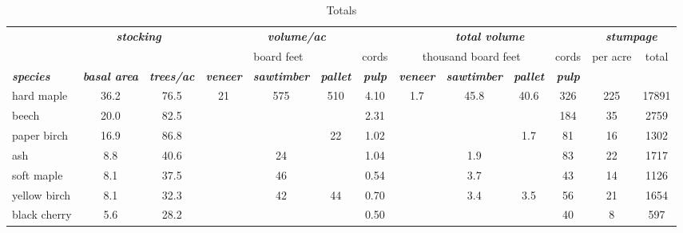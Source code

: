\documentclass[landscape]{article}
\begin{document}
\begin{table}[H]

\caption{\label{tab:unnamed-chunk-58}Totals}
\fontsize{10}{12}\selectfont
\begin{tabular}[t]{lcccccccccccc}
\toprule
\multicolumn{1}{c}{\em{\textbf{ }}} & \multicolumn{2}{c}{\em{\textbf{stocking}}} & \multicolumn{4}{c}{\em{\textbf{volume/ac }}} & \multicolumn{4}{c}{\em{\textbf{total volume}}} & \multicolumn{2}{c}{\em{\textbf{stumpage}}} \\
\cmidrule(l{3pt}r{3pt}){2-3} \cmidrule(l{3pt}r{3pt}){4-7} \cmidrule(l{3pt}r{3pt}){8-11} \cmidrule(l{3pt}r{3pt}){12-13}
\multicolumn{3}{c}{ } & \multicolumn{3}{c}{board feet} & \multicolumn{1}{c}{cords} & \multicolumn{3}{c}{thousand board feet} & \multicolumn{1}{c}{cords} & \multicolumn{1}{c}{per acre} & \multicolumn{1}{c}{total} \\
\cmidrule(l{3pt}r{3pt}){4-6} \cmidrule(l{3pt}r{3pt}){7-7} \cmidrule(l{3pt}r{3pt}){8-10} \cmidrule(l{3pt}r{3pt}){11-11} \cmidrule(l{3pt}r{3pt}){12-12} \cmidrule(l{3pt}r{3pt}){13-13}
\rowcolor[HTML]{DCDCDC}  \em{\textbf{species}} & \em{\textbf{basal area}} & \em{\textbf{trees/ac}} & \em{\textbf{veneer}} & \em{\textbf{sawtimber}} & \em{\textbf{pallet}} & \em{\textbf{pulp}} & \em{\textbf{veneer}} & \em{\textbf{sawtimber}} & \em{\textbf{pallet}} & \em{\textbf{pulp}} & \em{\textbf{ }} & \em{\textbf{ }}\\
\midrule
\rowcolor{gray!6}  hard maple & 36.2 & 76.5 & 21 & 575 & 510 & 4.10 & 1.7 & 45.8 & 40.6 & 326 & 225 & 17891\\
 
beech & 20.0 & 82.5 &  &  &  & 2.31 &  &  &  & 184 & 35 & 2759\\
 
\rowcolor{gray!6}  paper birch & 16.9 & 86.8 &  &  & 22 & 1.02 &  &  & 1.7 & 81 & 16 & 1302\\
 
ash & 8.8 & 40.6 &  & 24 &  & 1.04 &  & 1.9 &  & 83 & 22 & 1717\\
 
\rowcolor{gray!6}  soft maple & 8.1 & 37.5 &  & 46 &  & 0.54 &  & 3.7 &  & 43 & 14 & 1126\\
 
yellow birch & 8.1 & 32.3 &  & 42 & 44 & 0.70 &  & 3.4 & 3.5 & 56 & 21 & 1654\\
 
\rowcolor{gray!6}  black cherry & 5.6 & 28.2 &  &  &  & 0.50 &  &  &  & 40 & 8 & 597\\
 

\end{tabular}
\end{table}
\end{document}
